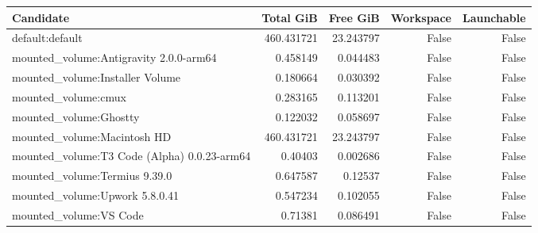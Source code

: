 {\small
\begin{tabular}{lrrrr}
\hline
Candidate & Total GiB & Free GiB & Workspace & Launchable \\
\hline
default:default & 460.431721 & 23.243797 & False & False \\
mounted_volume:Antigravity 2.0.0-arm64 & 0.458149 & 0.044483 & False & False \\
mounted_volume:Installer Volume & 0.180664 & 0.030392 & False & False \\
mounted_volume:cmux & 0.283165 & 0.113201 & False & False \\
mounted_volume:Ghostty & 0.122032 & 0.058697 & False & False \\
mounted_volume:Macintosh HD & 460.431721 & 23.243797 & False & False \\
mounted_volume:T3 Code (Alpha) 0.0.23-arm64 & 0.40403 & 0.002686 & False & False \\
mounted_volume:Termius 9.39.0 & 0.647587 & 0.12537 & False & False \\
mounted_volume:Upwork 5.8.0.41 & 0.547234 & 0.102055 & False & False \\
mounted_volume:VS Code & 0.71381 & 0.086491 & False & False \\
\hline
\end{tabular}
}
